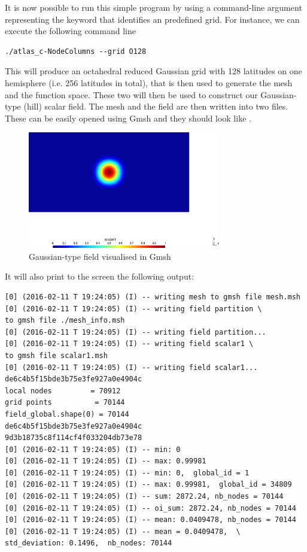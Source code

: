 %
It is now possible to run this simple program by using 
a command-line argument representing the keyword that 
identifies an \Atlas predefined grid.  For instance, 
we can execute the following command line
%
\begin{lstlisting}[style=BashStyle]
./atlas_c-NodeColumns --grid O128
\end{lstlisting}
% 
This will produce an octahedral reduced Gaussian grid 
with 128 latitudes on one hemisphere (i.e. 256 latitudes 
in total), that is then used to generate the mesh and the 
 function space. These two will then be used 
to construct our Gaussian-type (hill) scalar field.
The mesh and the field are then written into two 
files. These can be easily opened using Gmsh and they should 
look like .
%
\begin{figure}%
\centering
\includegraphics[width=0.75\textwidth]{imgs/O128-field.png}
\caption{Gaussian-type field visualised in Gmsh}%
\label{fig:fs_nodes-C}%
\end{figure}
%
It will also print to the screen the following output:
%
\begin{lstlisting}[style=BashStyle]
[0] (2016-02-11 T 19:24:05) (I) -- writing mesh to gmsh file mesh.msh
[0] (2016-02-11 T 19:24:05) (I) -- writing field partition \
to gmsh file ./mesh_info.msh
[0] (2016-02-11 T 19:24:05) (I) -- writing field partition...
[0] (2016-02-11 T 19:24:05) (I) -- writing field scalar1 \
to gmsh file scalar1.msh
[0] (2016-02-11 T 19:24:05) (I) -- writing field scalar1...
de6c4b5f15bde3b75e3fe927a0e4904c
local nodes         = 70912
grid points          = 70144
field_global.shape(0) = 70144
de6c4b5f15bde3b75e3fe927a0e4904c
9d3b18735c8f114cf4f033204db73e78
[0] (2016-02-11 T 19:24:05) (I) -- min: 0
[0] (2016-02-11 T 19:24:05) (I) -- max: 0.99981
[0] (2016-02-11 T 19:24:05) (I) -- min: 0,  global_id = 1
[0] (2016-02-11 T 19:24:05) (I) -- max: 0.99981,  global_id = 34809
[0] (2016-02-11 T 19:24:05) (I) -- sum: 2872.24, nb_nodes = 70144
[0] (2016-02-11 T 19:24:05) (I) -- oi_sum: 2872.24, nb_nodes = 70144
[0] (2016-02-11 T 19:24:05) (I) -- mean: 0.0409478, nb_nodes = 70144
[0] (2016-02-11 T 19:24:05) (I) -- mean = 0.0409478,  \
std_deviation: 0.1496,  nb_nodes: 70144
\end{lstlisting}
